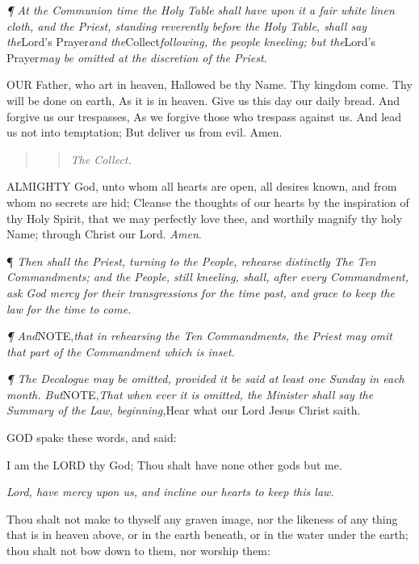 \emph{¶
At the Communion time the Holy Table shall have upon it a fair white linen
cloth, and the Priest, standing reverently before the Holy Table, shall
say the}Lord’s Prayer\emph{and the}Collect\emph{following,
the people kneeling; but the}Lord’s Prayer\emph{may be omitted
at the discretion of the Priest.}

OUR
Father, who art in heaven, Hallowed be thy Name. Thy kingdom come. Thy
will be done on earth, As it is in heaven. Give us this day our daily
bread. And forgive us our trespasses, As we forgive those who trespass
against us. And lead us not into temptation; But deliver us from evil.
Amen.

\begin{quote}

\begin{quote}

\emph{The
Collect.}

\end{quote}

\end{quote}

ALMIGHTY
God, unto whom all hearts are open, all desires known, and from whom no
secrets are hid; Cleanse the thoughts of our hearts by the inspiration
of thy Holy Spirit, that we may perfectly love thee, and worthily magnify
thy holy Name; through Christ our Lord. \emph{Amen}.

¶
\emph{Then shall the Priest, turning to the People, rehearse distinctly
The Ten Commandments; and the People, still kneeling, shall, after every
Commandment, ask God mercy for their transgressions for the time past,
and grace to keep the law for the time to come.}

\emph{¶
And}NOTE,\emph{that in rehearsing the Ten Commandments, the Priest may omit that part
of the Commandment which is inset.}

\emph{¶
The Decalogue may be omitted, provided it be said at least one Sunday
in each month. But}NOTE,\emph{That when ever it is omitted, the Minister shall say the Summary of the
Law, beginning,}Hear what our Lord Jesus Christ saith.

GOD
spake these words, and said:

\textbf{}I am the LORD
thy God; Thou shalt have none other gods but me.

\emph{Lord, have mercy upon us, and incline our hearts
to keep this law.}

Thou shalt not make to thyself any graven image, nor the likeness of any
thing that is in heaven above, or in the earth beneath, or in the water
under the earth; thou shalt not bow down to them, nor worship them:

